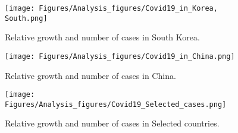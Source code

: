 \begin{figure}
    \centering
    \texttt{[image: Figures/Analysis\_figures/Covid19\_in\_Korea, South.png]}
    \caption{Relative growth and number of cases in South Korea.}\label{fig:SouthKorea}
\end{figure}

\begin{figure}
    \centering
    \texttt{[image: Figures/Analysis\_figures/Covid19\_in\_China.png]}
    \caption{Relative growth and number of cases in China.}\label{fig:China}
\end{figure}

\begin{figure}
    \centering
    \texttt{[image: Figures/Analysis\_figures/Covid19\_Selected\_cases.png]}
    \caption{Relative growth and number of cases in Selected countries.}\label{fig:Selected}
\end{figure}
